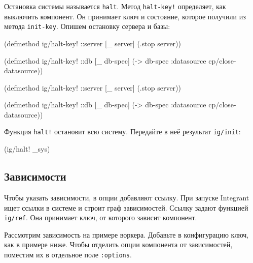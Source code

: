 \fi

Остановка системы называется \verb|halt|. Метод \verb|halt-key!| определяет,
как выключить компонент. Он принимает ключ и состояние, которое получили из
метода \verb|init-key|. Опишем остановку сервера и базы:

\ifx\DEVICETYPE\MOBILE

\begin{english}
  \begin{clojure}
(defmethod ig/halt-key! ::server
  [_ server]
  (.stop server))

(defmethod ig/halt-key! ::db
  [_ db-spec]
  (-> db-spec
      :datasource
      cp/close-datasource))
  \end{clojure}
\end{english}

\else

\begin{english}
  \begin{clojure}
(defmethod ig/halt-key! ::server
  [_ server]
  (.stop server))

(defmethod ig/halt-key! ::db
  [_ db-spec]
  (-> db-spec :datasource cp/close-datasource))
  \end{clojure}
\end{english}

\fi

\noindent
Функция \verb|halt!| остановит всю систему. Передайте в неё результат
\verb|ig/init|:

\begin{english}
  \begin{clojure}
(ig/halt! _sys)
  \end{clojure}
\end{english}

\subsection{Зависимости}


Чтобы указать зависимости, в опции добавляют ссылку. При запуске Integrant ищет
ссылки в системе и строит граф зависимостей. Ссылку задают функцией
\verb|ig/ref|. Она принимает ключ, от которого зависит компонент.

Рассмотрим зависимость на примере воркера. Добавьте в конфигурацию ключ, как в
примере ниже. Чтобы отделить опции компонента от зависимостей, поместим их в
отдельное поле \verb|:options|.

